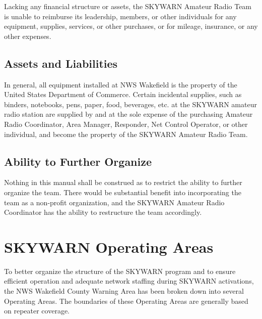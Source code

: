 \documentclass[pdflatex,letterpaper,twoside,12pt]{book}
\begin{document}
Lacking any financial structure or assets, the SKYWARN Amateur Radio Team is unable to reimburse its leadership, members, or other individuals for any equipment, supplies, services, or other purchases, or for mileage, insurance, or any other expenses.


\section{Assets and Liabilities}

In general, all equipment installed at NWS Wakefield is the property of the United States Department of Commerce.  Certain incidental supplies, such as binders, notebooks, pens, paper, food, beverages, etc. at the SKYWARN amateur radio station are supplied by and at the sole expense of the purchasing Amateur Radio Coordinator, Area Manager, Responder, Net Control Operator, or other individual, and become the property of the SKYWARN Amateur Radio Team. 


\section{Ability to Further Organize}

Nothing in this manual shall be construed as to restrict the ability to further organize the team.  There would be substantial benefit into incorporating the team as a non-profit organization, and the SKYWARN Amateur Radio Coordinator has the ability to restructure the team accordingly.


\chapter{SKYWARN Operating Areas}

To better organize the structure of the SKYWARN program and to ensure efficient operation and adequate network staffing during SKYWARN activations, the NWS Wakefield County Warning Area has been broken down into several Operating Areas.  The boundaries of these Operating Areas are generally based on repeater coverage.
\end{document}
